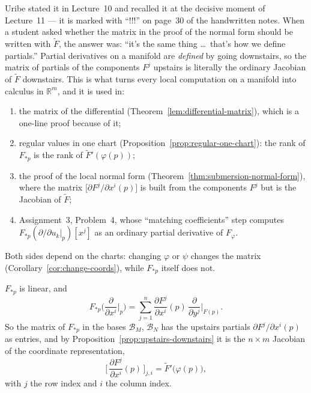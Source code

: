 \documentclass[11pt]{report}
\makeatletter
\newcounter{thmcounter}[section]
\newcommand{\thmlabel}[1]{\edef\@currentlabel{\arabic{section}.\arabic{thmcounter}}\label{#1}}
\newcommand{\leeref}[1]{\par\smallskip{\raggedleft\footnotesize\textsc{Lee}:\ #1\par}}
\makeatother
\begin{document}
\begin{rembox}\label{rem:why-this-identity-carries-so-much}
Uribe stated it in Lecture~10 and recalled it at the decisive moment of Lecture~11 --- it is marked with ``!!!'' on page~30 of the handwritten notes. When a student asked whether the matrix in the proof of the normal form should be written with $\tilde F$, the answer was: ``it's the same thing \ldots\ that's how we define partials.'' Partial derivatives on a manifold are \emph{defined} by going downstairs, so the matrix of partials of the components $F^j$ upstairs is literally the ordinary Jacobian of $\tilde F$ downstairs. This is what turns every local computation on a manifold into calculus in $\mathbb{R}^m$, and it is used in:
\begin{enumerate}
    \item the matrix of the differential (Theorem~\ref{lem:differential-matrix}), which is a one-line proof because of it;
    \item regular values in one chart (Proposition~\ref{prop:regular-one-chart}): the rank of $F_{*p}$ is the rank of $\tilde F'(\varphi(p))$;
    \item the proof of the local normal form (Theorem~\ref{thm:submersion-normal-form}), where the matrix $\big[\partial F^j/\partial x^i(p)\big]$ is built from the components $F^j$ but is the Jacobian of $\tilde F$;
    \item Assignment~3, Problem~4, whose ``matching coefficients'' step computes $F_{*p}(\partial/\partial u_k|_p)[x^j]$ as an ordinary partial derivative of $F_\varphi$.
\end{enumerate}
Both sides depend on the charts: changing $\varphi$ or $\psi$ changes the matrix (Corollary~\ref{cor:change-coords}), while $F_{*p}$ itself does not.
\end{rembox}

\begin{thmbox}\thmlabel{lem:differential-matrix}
$F_{*p}$ is linear, and
\[
F_{*p}\Big(\frac{\partial}{\partial x^i}\Big|_p\Big) = \sum_{j=1}^n \frac{\partial F^j}{\partial x^i}(p)\, \frac{\partial}{\partial y^j}\Big|_{F(p)} .
\]
So the matrix of $F_{*p}$ in the bases $\mathcal{B}_M$, $\mathcal{B}_N$ has the upstairs partials $\partial F^j/\partial x^i(p)$ as entries, and by Proposition~\ref{prop:upstairs-downstairs} it is the $n \times m$ Jacobian of the coordinate representation,
\[
\Big[\, \frac{\partial F^j}{\partial x^i}(p) \,\Big]_{j, i} = \tilde F'\big(\varphi(p)\big),
\]
with $j$ the row index and $i$ the column index.
\leeref{Ch.~3, \emph{Computations in Coordinates}}
\end{thmbox}
\end{document}
